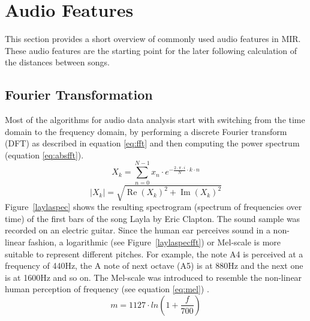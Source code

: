 \section{Audio Features}\label{featsec2}

This section provides a short overview of commonly used audio features in MIR. These audio features are the starting point for the later following calculation of the distances between songs.

\subsection{Fourier Transformation}\label{featsec}

Most of the algorithms for audio data analysis start with switching from the time domain to the frequency domain, by performing a discrete Fourier transform (DFT) as described in equation \eqref{eq:fft} and then computing the power spectrum (equation \eqref{eq:absfft}).
\begin{equation} \label{eq:fft}
X_k = \sum_{n=0}^{N-1}{x_n \cdot e^ { - \frac{ 2 \cdot \pi \cdot i}{N}\cdot k\cdot n}}
\end{equation}
\begin{equation} \label{eq:absfft}
|X_k| = \sqrt{\operatorname{Re}(X_k)^2 + \operatorname{Im}(X_k)^2}
\end{equation}
Figure~\ref{laylaspec} shows the resulting spectrogram (spectrum of frequencies over time) of the first bars of the song Layla by Eric Clapton. The sound sample was recorded on an electric guitar. Since the human ear perceives sound in a non-linear fashion, a logarithmic (see Figure~\ref{laylaspecfft}) or Mel-scale is more suitable to represent different pitches. For example, the note A4 is perceived at a frequency of 440Hz, the A note of next octave (A5) is at 880Hz and the next one is at 1600Hz and so on. The Mel-scale was introduced to resemble the non-linear human perception of frequency (see equation \eqref{eq:mel}) \cite[pp. 53f]{knees1}.
\begin{equation} \label{eq:mel}
m = 1127 \cdot ln(1 + \frac{f}{700})
\end{equation}

